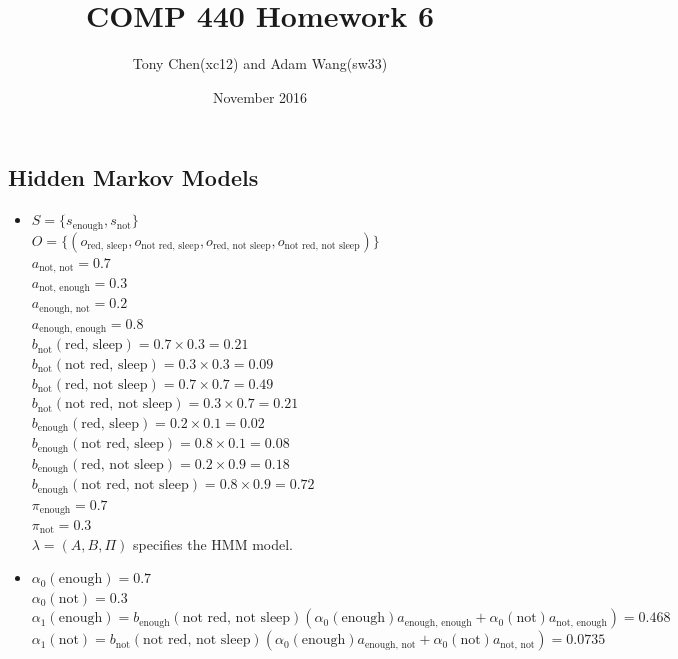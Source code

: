 \documentclass[11pt]{article}
\title{COMP 440 Homework 6}
\author{Tony Chen(xc12) and Adam Wang(sw33)}
\date{November 2016}
\begin{document}
\begin{onehalfspace}
\maketitle{}
\section{Hidden Markov Models}
\begin{itemize}
	\item
	$S = \{s_{\text{enough}},s_{\text{not}}\}$\\
	$O = \{(o_{\text{red, sleep}},o_{\text{not red, sleep}},o_{\text{red, not sleep}},o_{\text{not red, not sleep}})\}$\\
	$a_{\text{not, not}} = 0.7$\\
	$a_{\text{not, enough}} = 0.3$\\
	$a_{\text{enough, not}} = 0.2$\\
	$a_{\text{enough, enough}} = 0.8$\\
	$b_{\text{not}}(\text{red, sleep}) = 0.7\times0.3 = 0.21$\\
	$b_{\text{not}}(\text{not red, sleep}) = 0.3\times0.3 = 0.09$\\
	$b_{\text{not}}(\text{red, not sleep}) = 0.7\times0.7 = 0.49$\\
	$b_{\text{not}}(\text{not red, not sleep}) = 0.3\times0.7 = 0.21$\\
	$b_{\text{enough}}(\text{red, sleep}) = 0.2\times0.1 = 0.02$\\
	$b_{\text{enough}}(\text{not red, sleep}) = 0.8\times0.1 = 0.08$\\
	$b_{\text{enough}}(\text{red, not sleep}) = 0.2\times0.9 = 0.18$\\
	$b_{\text{enough}}(\text{not red, not sleep}) = 0.8\times0.9 = 0.72$\\
	$\pi_{\text{enough}} = 0.7$\\
	$\pi_{\text{not}} = 0.3$\\
	$\lambda = (A,B,\Pi)$ specifies the HMM model.
	\item
	$\alpha_0(\text{enough}) = 0.7$\\
	$\alpha_0(\text{not}) = 0.3$\\
	$\alpha_1(\text{enough}) = b_{\text{enough}}(\text{not red, not sleep})(\alpha_0(\text{enough})a_{\text{enough, enough}} + \alpha_0(\text{not})a_{\text{not, enough}}) = 0.468$\\
	$\alpha_1(\text{not}) = b_{\text{not}}(\text{not red, not sleep})(\alpha_0(\text{enough})a_{\text{enough, not}} + \alpha_0(\text{not})a_{\text{not, not}}) = 0.0735$\\

\end{itemize}
\end{onehalfspace}
\end{document}

